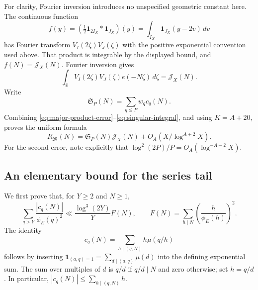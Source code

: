 \documentclass[11pt,letterpaper]{article}
\numberwithin{equation}{section}
\theoremstyle{remark}
\newcommand{\R}{\mathbb R}
\newcommand{\tot}{\phi_{\!E}}
\newcommand{\ind}{\mathbf 1}
\begin{document}
For clarity, Fourier inversion introduces no unspecified geometric
constant here. The continuous function
\[
 f(y)=\left(\tfrac12\ind_{2I_X}*\ind_{J_X}\right)(y)
 =\int_{I_X}\ind_{J_X}(y-2v)\,dv
\]
has Fourier transform $V_I(2\zeta)V_J(\zeta)$ with the positive
exponential convention used above. That product is integrable by
the displayed bound, and $f(N)=\mathcal J_X(N)$. Fourier inversion gives
\begin{equation}\label{eq:singular-integral}
 \int_\R V_I(2\zeta)V_J(\zeta)e(-N\zeta)\,d\zeta
 =\mathcal J_X(N).
\end{equation}
Write
\[
 \mathfrak S_P(N)=\sum_{q\le P}w_qc_q(N).
\]
Combining \eqref{eq:major-product-error}--\eqref{eq:singular-integral},
and using $K=A+20$, proves the uniform formula
\begin{equation}\label{eq:major-final}
 R_{\mathfrak M}(N)
 =\mathfrak S_P(N)\mathcal J_X(N)+O_A(X/\log^{A+2}X).
\end{equation}
For the second error, note explicitly that
$\log^2(2P)/P=O_A(\log^{-A-2}X)$.

\subsection{An elementary bound for the series tail}

We first prove that, for $Y\ge2$ and $N\ge1$,
\begin{equation}\label{eq:series-tail}
 \sum_{q>Y}\frac{|c_q(N)|}{\tot(q)^2}
 \ll\frac{\log^3(2Y)}{Y}
       F(N),\qquad
 F(N)=\sum_{h\mid N}\left(\frac{h}{\tot(h)}\right)^2.
\end{equation}
The identity
\begin{equation}\label{eq:ramanujan-identity}
 c_q(N)=\sum_{h\mid(q,N)}h\mu(q/h)
\end{equation}
follows by inserting
$\ind_{(a,q)=1}=\sum_{d\mid(a,q)}\mu(d)$ into the defining exponential
sum. The sum over multiples of $d$ is $q/d$ if $q/d\mid N$ and
zero otherwise; set $h=q/d$. In particular,
$|c_q(N)|\le\sum_{h\mid(q,N)}h$.
\end{document}
